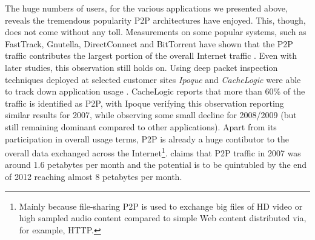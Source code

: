 

The huge numbers of users, for the various applications we presented above,
reveals the tremendous popularity P2P architectures have enjoyed. This, though,
does not come without any toll. Measurements on some popular systems, such as
FastTrack, Gnutella, DirectConnect and BitTorrent have shown that the P2P
traffic contributes the largest portion of the overall Internet traffic
\cite{seroiu_analysiscds_2002,sen_analyzep2ptraffic_2004,krp_ispfear_2005}.
Even with later studies, this observation still holds on. Using deep packet
inspection techniques deployed at selected customer sites \emph{Ipoque} and
\emph{CacheLogic} were able to track down application usage \cite{cachelogic,ipoque2007,ipoque2009}.
CacheLogic reports that more than 60\% of the traffic is identified as P2P, with
Ipoque verifying this observation reporting similar results for 2007, while
observing some small decline for 2008/2009 (but still remaining dominant
compared to other applications). Apart from its participation in overall usage
terms, P2P is already a huge contibutor to the overall data exchanged across the
Internet\footnote{
  Mainly because file-sharing P2P is used to exchange big files of HD video or
  high sampled audio content compared to simple Web content distributed via, for
  example, HTTP.
}.
\cite{multinteligence} claims that P2P traffic in 2007 was around 1.6 petabytes
per month and the potential is to be quintubled by the end of 2012 reaching
almost 8 petabytes per month.

%
%


